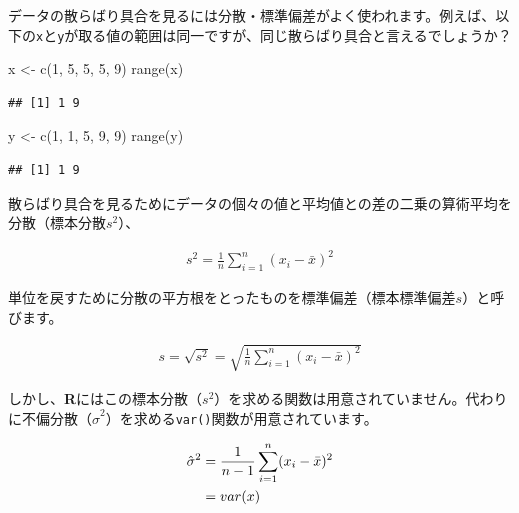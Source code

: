 \documentclass[
  12pt,
]{book}
\newenvironment{Shaded}{\begin{snugshade}}{\end{snugshade}}
\newcommand{\DecValTok}[1]{\textcolor[rgb]{0.00,0.00,0.81}{#1}}
\newcommand{\FunctionTok}[1]{\textcolor[rgb]{0.00,0.00,0.00}{#1}}
\newcommand{\NormalTok}[1]{#1}
\newcommand{\OtherTok}[1]{\textcolor[rgb]{0.56,0.35,0.01}{#1}}
\begin{document}
データの散らばり具合を見るには分散・標準偏差がよく使われます。例えば、以下の\texttt{x}と\texttt{y}が取る値の範囲は同一ですが、同じ散らばり具合と言えるでしょうか？

\begin{Shaded}
\begin{Highlighting}[numbers=left,,]
\NormalTok{x }\OtherTok{\textless{}{-}} \FunctionTok{c}\NormalTok{(}\DecValTok{1}\NormalTok{, }\DecValTok{5}\NormalTok{, }\DecValTok{5}\NormalTok{, }\DecValTok{5}\NormalTok{, }\DecValTok{9}\NormalTok{)}
\FunctionTok{range}\NormalTok{(x)}
\end{Highlighting}
\end{Shaded}

\begin{verbatim}
## [1] 1 9
\end{verbatim}

\begin{Shaded}
\begin{Highlighting}[numbers=left,,]
\NormalTok{y }\OtherTok{\textless{}{-}} \FunctionTok{c}\NormalTok{(}\DecValTok{1}\NormalTok{, }\DecValTok{1}\NormalTok{, }\DecValTok{5}\NormalTok{, }\DecValTok{9}\NormalTok{, }\DecValTok{9}\NormalTok{)}
\FunctionTok{range}\NormalTok{(y)}
\end{Highlighting}
\end{Shaded}

\begin{verbatim}
## [1] 1 9
\end{verbatim}

散らばり具合を見るためにデータの個々の値と平均値との差の二乗の算術平均を分散（標本分散\(s^2\)）、

\begin{align}
  s^2 = \frac{1}{n} \sum_{i = 1}^n (x_i - \bar{x})^2 \label{eq:variance}
\end{align}

単位を戻すために分散の平方根をとったものを標準偏差（標本標準偏差\(s\)）と呼びます。

\begin{align}
  s = \sqrt{s^2} = \sqrt{\frac{1}{n} \sum_{i = 1}^n (x_i - \bar{x})^2} \label{eq:standatd-deviation}
\end{align}

しかし、\textbf{R}にはこの標本分散（\(s^2\)）を求める関数は用意されていません。代わりに不偏分散（\(\hat{\sigma}^2\)）を求める\texttt{var()}関数が用意されています。

\begin{align}
  \hat{\sigma}^2 &= \frac{1}{n - 1} \sum_{i = 1}^n (x_i - \bar{x})^2 \label{eq:var} \\
  &= var(x) \notag
\end{align}
\end{document}
